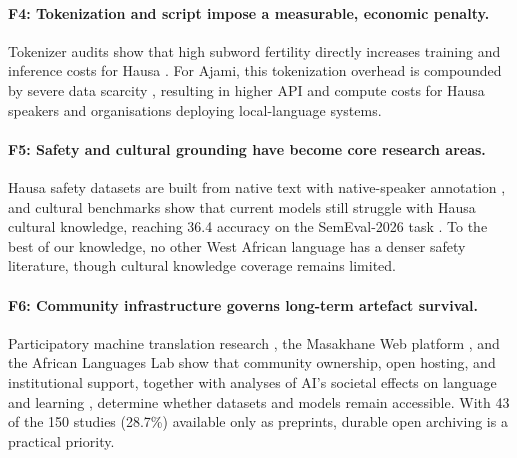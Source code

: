 \documentclass[sn-basic,pdflatex]{sn-jnl}
\begin{document}
\paragraph{F4: Tokenization and script impose a measurable, economic penalty.}
Tokenizer audits show that high subword fertility directly increases training and inference costs for Hausa \citep{p019,p152}. For Ajami, this tokenization overhead is compounded by severe data scarcity \citep{p002,p023}, resulting in higher API and compute costs for Hausa speakers and organisations deploying local-language systems.
\paragraph{F5: Safety and cultural grounding have become core research areas.}
Hausa safety datasets are built from native text with native-speaker annotation \citep{p058,p059,p071,p134,p135,p136,p137,p138,p139,p140,p141,p142,p146}, and cultural benchmarks \citep{p020,p144,p148} show that current models still struggle with Hausa cultural knowledge, reaching 36.4 accuracy on the SemEval-2026 task \citep{p020}. To the best of our knowledge, no other West African language has a denser safety literature, though cultural knowledge coverage remains limited.
\paragraph{F6: Community infrastructure governs long-term artefact survival.}
Participatory machine translation research \citep{p079}, the Masakhane Web platform \citep{p080}, and the African Languages Lab \citep{p081} show that community ownership, open hosting, and institutional support, together with analyses of AI's societal effects on language and learning \citep{p082}, determine whether datasets and models remain accessible. With 43 of the 150 studies (28.7\%) available only as preprints, durable open archiving is a practical priority.
\end{document}
